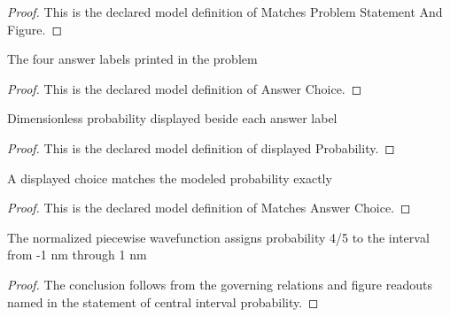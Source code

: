 \begin{proof}
  This is the declared model definition of Matches Problem Statement And Figure.
\end{proof}
\begin{definition}
  \label{def:physics:phyx-mini-0647:phyxminiproblems-problemphyxmini0647-answerchoice}
  The four answer labels printed in the problem
\end{definition}
\begin{proof}
  This is the declared model definition of Answer Choice.
\end{proof}
\begin{definition}
  \label{def:physics:phyx-mini-0647:phyxminiproblems-problemphyxmini0647-answerchoice-displayedprobability}
  Dimensionless probability displayed beside each answer label
\end{definition}
\begin{proof}
  This is the declared model definition of displayed Probability.
\end{proof}
\begin{definition}
  \label{def:physics:phyx-mini-0647:phyxminiproblems-problemphyxmini0647-matchesanswerchoice}
  A displayed choice matches the modeled probability exactly
\end{definition}
\begin{proof}
  This is the declared model definition of Matches Answer Choice.
\end{proof}
\begin{lemma}
  \label{lem:physics:phyx-mini-0647:phyxminiproblems-problemphyxmini0647-central-interval-probability}
  The normalized piecewise wavefunction assigns probability 4/5 to the interval from -1 nm through 1 nm
\end{lemma}
\begin{proof}
  The conclusion follows from the governing relations and figure readouts named in the statement of central interval probability.
\end{proof}
